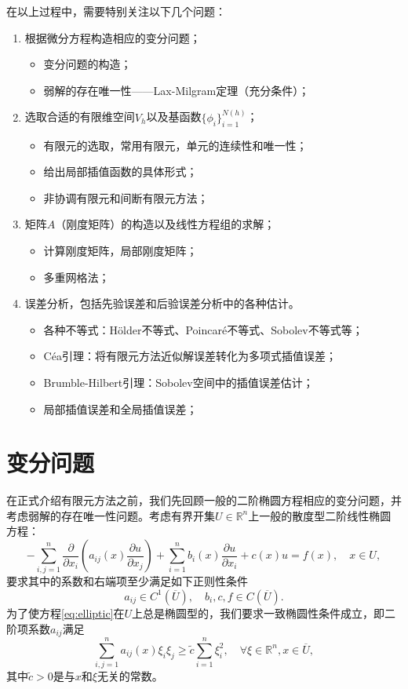 \documentclass[a4paper,10pt]{ctexart}
\begin{document}
在以上过程中，需要特别关注以下几个问题：
\begin{enumerate}
    \item 根据微分方程构造相应的变分问题；
    \begin{itemize}
        \item 变分问题的构造；
        \item 弱解的存在唯一性——Lax-Milgram定理（充分条件）；
    \end{itemize}
    \item 选取合适的有限维空间$ V_h $以及基函数$ \{\phi_i\}_{i=1}^{N(h)} $；
    \begin{itemize}
        \item 有限元的选取，常用有限元，单元的连续性和唯一性；
        \item 给出局部插值函数的具体形式；
        \item 非协调有限元和间断有限元方法；
    \end{itemize}
    \item 矩阵$ A $（刚度矩阵）的构造以及线性方程组的求解；
    \begin{itemize}
        \item 计算刚度矩阵，局部刚度矩阵；
        \item 多重网格法；
    \end{itemize}
    \item 误差分析，包括先验误差和后验误差分析中的各种估计。
    \begin{itemize}
        \item 各种不等式：Hölder不等式、Poincaré不等式、Sobolev不等式等；
        \item Céa引理：将有限元方法近似解误差转化为多项式插值误差；
        \item Brumble-Hilbert引理：Sobolev空间中的插值误差估计；
        \item 局部插值误差和全局插值误差；
    \end{itemize}
\end{enumerate}

\section{变分问题}
在正式介绍有限元方法之前，我们先回顾一般的二阶椭圆方程相应的变分问题，并考虑弱解的存在唯一性问题。考虑有界开集$ U\in \mathbb{R}^n $上一般的散度型二阶线性椭圆方程：
\begin{equation}\label{eq:elliptic}
    -\sum_{i,j=1}^n \frac{\partial}{\partial x_i}\left( a_{ij}(x)\frac{\partial u}{\partial x_j} \right) + \sum_{i=1}^n b_i(x)\frac{\partial u}{\partial x_i} + c(x)u = f(x),\quad x\in U,
\end{equation}
要求其中的系数和右端项至少满足如下正则性条件
\[
    a_{ij}\in C^1(\overline{U}),\quad b_i,c,f\in C(\overline{U}).
\]
为了使方程\eqref{eq:elliptic}在$ U $上总是椭圆型的，我们要求一致椭圆性条件成立，即二阶项系数$ a_{ij} $满足
\begin{equation}\label{eq:uniform_elliptic}
    \sum_{i,j=1}^n a_{ij}(x)\xi_i\xi_j \geqslant \tilde{c} \sum_{i=1}^n \xi_i^2,\quad \forall \xi\in \mathbb{R}^n,x\in \overline{U},
\end{equation}
其中$ \tilde{c}>0 $是与$ x $和$ \xi $无关的常数。
\end{document}
